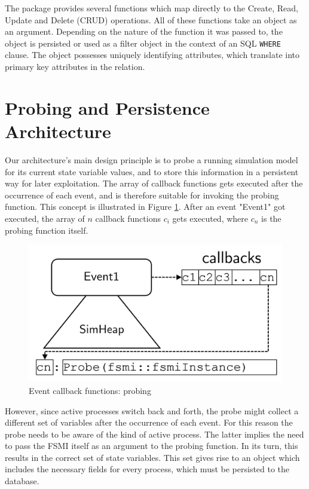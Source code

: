 \documentclass{juliacon}
\begin{document}
The package provides several functions which map directly to the Create, Read, Update and Delete (CRUD) operations. All of these functions take an object as an argument. Depending on the nature of the function it was passed to, the object is persisted or used as a filter object in the context of an SQL \texttt{WHERE} clause. The object possesses uniquely identifying attributes, which translate into primary key attributes in the relation. \vskip 6pt

\section{Probing and Persistence Architecture}\label{PArch}

Our architecture's main design principle is to probe a running simulation model for its current state variable values, and to store this information in a persistent way for later exploitation. The array of callback functions gets executed after the occurrence of each event, and is therefore suitable for invoking the probing function.
This concept is illustrated in Figure \ref{fig:cbprobing}. After an event "Event1" got executed, the array of $n$ callback functions $c_i$ gets executed, where $c_n$ is the probing function itself.

\begin{figure}[th]
	\centering
	\includegraphics[width=0.9\linewidth]{images/simHeapCallbacksProbe}
	\caption{Event callback functions: probing}
	\label{fig:cbprobing}
\end{figure}
 However, since active processes switch back and forth, the probe might collect a different set of variables after the occurrence of each event. For this reason the probe needs to be aware of the kind of active process. The latter implies the need to pass the FSMI itself as an argument to the probing function. In its turn, this results in the correct set of state variables. This set gives rise to an object which includes the necessary fields for every process, which must be persisted to the database. \vskip 6pt
\end{document}
